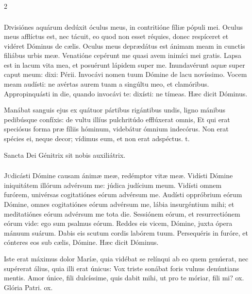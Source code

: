 \documentclass[9pt,twoside]{extarticle}
\begin{document}
\begin{multicols}{2}
\subsubsection*{\center {}}
\lettrine{D}ivisiónes aquárum dedúxit óculus meus, in contritióne fíliæ pópuli mei.
Oculus meus afflíctus est, nec tácuit, eo quod non esset réquies,
donec respíceret et vidéret Dóminus de cælis.
Oculus meus deprædátus est ánimam meam in cunctis filiábus urbis meæ.
Venatióne cepérunt me quasi avem inimíci mei gratis.
Lapsa est in lacum vita mea, et posuérunt lápidem super me.
Inundavérunt aquæ super caput meum: dixi: Périi.
Invocávi nomen tuum Dómine de lacu novíssimo.
Vocem meam audísti: ne avértas aurem tuam a singúltu meo, et clamóribus.
Appropinquásti in die, quando invocávi te: dixísti: ne tímeas. Hæc dicit Dóminus.

\begin{tightlist}{}
\item {} Manábat sanguis ejus ex quátuor pártibus rigántibus undis, ligno mánibus pedibúsque confíxis: de vultu illíus pulchritúdo efflúxerat omnis, \textred{*} Et qui erat speciósus forma præ fíliis hóminum, videbátur ómnium indecórus.  Non erat spécies ei, neque decor; vídimus eum, et non erat adspéctus. t.
\item {\small {} Sancta Dei Génitrix sit nobis auxiliátrix.}
\end{tightlist}

\subsubsection*{\center {}}
\lettrine{J}udicásti Dómine causam ánimæ meæ, redémptor vitæ meæ.
Vidísti Dómine iniquitátem illórum advérsum me: júdica judícium meum.
Vidísti omnem furórem, univérsas cogitatiónes eórum advérsum me.
Audísti oppróbrium eórum Dómine, omnes cogitatiónes eórum advérsum me,
lábia insurgéntium mihi; et meditatiónes eórum advérsum me tota die.
Sessiónem eórum, et resurrectiónem eórum vide: ego sum psalmus eórum.
Reddes eis vicem, Dómine, juxta ópera mánuum suárum.
Dabis eis scutum cordis labórem tuum.
Persequéris in furóre, et cónteres eos sub cælis, Dómine. Hæc dicit Dóminus.

\begin{tightlist}{}
\item {} Iste erat máximus dolor Maríæ, quia vidébat se relínqui ab eo quem genúerat, nec supérerat álius, quia illi erat únicus: \textred{*} Vox triste sonábat foris vulnus denúntians mentis.  Amor únice, fili dulcíssime, quis dabit mihi, ut pro te móriar, fili mi? ox. Glória Patri. ox.
\end{tightlist}


\end{multicols}
\end{document}
